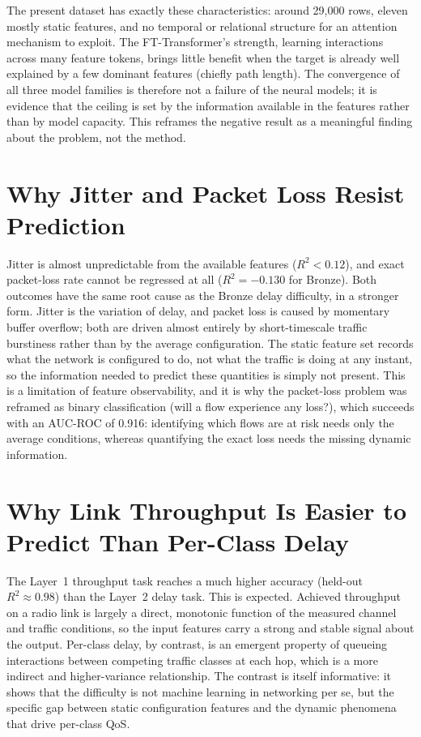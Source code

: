 \documentclass[a4paper,12pt]{Classes/RoboticsLaTeX}
\begin{document}
The present dataset has exactly these characteristics: around 29{,}000 rows, eleven mostly static features, and no temporal or relational structure for an attention mechanism to exploit. The FT-Transformer's strength, learning interactions across many feature tokens, brings little benefit when the target is already well explained by a few dominant features (chiefly path length). The convergence of all three model families is therefore not a failure of the neural models; it is evidence that the ceiling is set by the information available in the features rather than by model capacity. This reframes the negative result as a meaningful finding about the problem, not the method.

\section{Why Jitter and Packet Loss Resist Prediction}

Jitter is almost unpredictable from the available features ($R^2 < 0.12$), and exact packet-loss rate cannot be regressed at all ($R^2 = -0.130$ for Bronze). Both outcomes have the same root cause as the Bronze delay difficulty, in a stronger form. Jitter is the variation of delay, and packet loss is caused by momentary buffer overflow; both are driven almost entirely by short-timescale traffic burstiness rather than by the average configuration. The static feature set records what the network is configured to do, not what the traffic is doing at any instant, so the information needed to predict these quantities is simply not present. This is a limitation of feature observability, and it is why the packet-loss problem was reframed as binary classification (will a flow experience any loss?), which succeeds with an AUC-ROC of 0.916: identifying which flows are at risk needs only the average conditions, whereas quantifying the exact loss needs the missing dynamic information.

\section{Why Link Throughput Is Easier to Predict Than Per-Class Delay}

The Layer~1 throughput task reaches a much higher accuracy (held-out $R^2 \approx 0.98$) than the Layer~2 delay task. This is expected. Achieved throughput on a radio link is largely a direct, monotonic function of the measured channel and traffic conditions, so the input features carry a strong and stable signal about the output. Per-class delay, by contrast, is an emergent property of queueing interactions between competing traffic classes at each hop, which is a more indirect and higher-variance relationship. The contrast is itself informative: it shows that the difficulty is not machine learning in networking per se, but the specific gap between static configuration features and the dynamic phenomena that drive per-class QoS.
\end{document}
